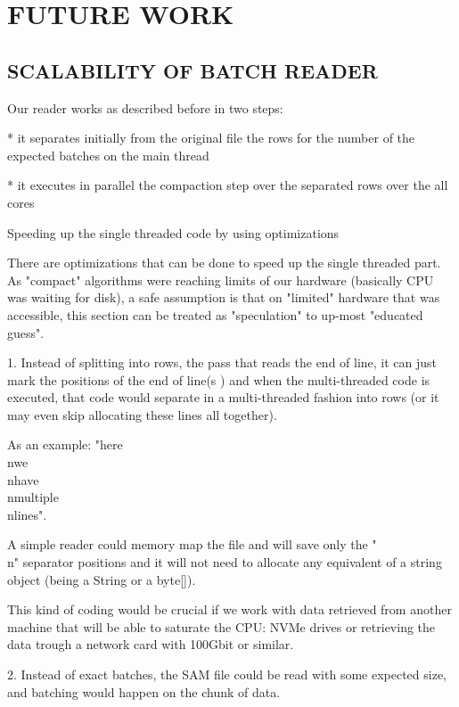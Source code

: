 \documentclass[a4paper,twoside]{article}
\begin{document}
\section{\uppercase{Future work}}\label{sec:uppercase}

\subsection{\uppercase{Scalability of batch reader}}\label{subsec:uppercase5}

Our reader works as described before in two steps:

* it separates initially from the original file the rows for the number of the expected batches on the main thread

* it executes in parallel the compaction step over the separated rows over the all cores

Speeding up the single threaded code by using optimizations

There are optimizations that can be done to speed up the single threaded part.
As "compact" algorithms were reaching limits of our hardware (basically CPU was waiting for disk), a safe assumption is
that on "limited" hardware that was accessible, this section can be treated as "speculation" to up-most "educated guess".

1.
Instead of splitting into rows, the pass that reads the end of line, it can just mark the positions of the end of line(s
) and when the multi-threaded code is executed, that code would separate in a multi-threaded fashion into rows (or it may even skip allocating these lines all together).

As an example: "here\\nwe\\nhave\\nmultiple\\nlines".

A simple reader could memory map the file and will save only the "\\n" separator positions and it will not need to allocate any equivalent of a string object
(being a String or a byte[]).

This kind of coding would be crucial if we work with data retrieved from another machine that will be able to saturate the CPU:
NVMe drives or retrieving the data trough a network card with 100Gbit or similar.

2.
Instead of exact batches, the SAM file could be read with some expected size, and batching would happen on the chunk of data.
\end{document}
